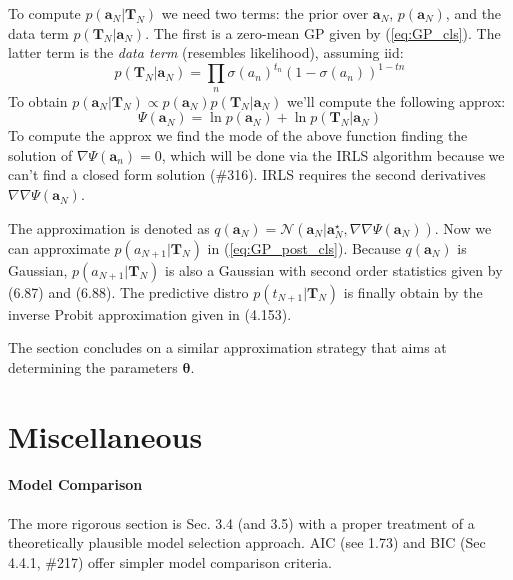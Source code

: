 \documentclass[a4paper]{article}
\newcommand{\mb}{\mathbf}
\newcommand{\bs}{\boldsymbol}
\begin{document}
To compute $p(\mb{a}_{N}|\mb{T}_{N})$ we need two terms: the prior over $\mb{a}_N$, $p(\mb{a}_{N})$, and the data term $p(\mb{T}_{N}|\mb{a}_{N})$. The first is a zero-mean GP given by (\ref{eq:GP_cls}). The latter term is the \textit{data term} (resembles likelihood), assuming iid:
%
\begin{equation}
p(\mb{T}_N|\mb{a}_N) = \prod\limits_n \sigma(a_n)^{t_n}(1-\sigma(a_n))^{1-tn}
\end{equation}
%
To obtain $p(\mb{a}_N|\mb{T}_N)\propto p(\mb{a}_N)p(\mb{T}_N|\mb{a}_N)$ we'll compute the following approx:
%
\begin{equation}
\Psi(\mb{a}_N) = \ln p(\mb{a}_N) + \ln p(\mb{T}_N|\mb{a}_N)
\end{equation}
%
To compute the approx we find the mode of the above function finding the solution of $\nabla \Psi(\mb{a}_n)=0$, which will be done via the IRLS algorithm because we can't find a closed form solution (\#316). IRLS requires the second derivatives $\nabla\nabla\Psi(\mb{a}_N)$.

The approximation is denoted as $q(\mb{a}_N) = \mathcal{N}(\mb{a}_N|\mb{a}_N^\star, \nabla\nabla\Psi(\mb{a}_N))$. Now we can approximate $p(a_{N+1}|\mb{T}_N)$ in (\ref{eq:GP_post_cls}). Because $q(\mb{a}_N)$ is Gaussian, $p(a_{N+1}|\mb{T}_N)$ is also a Gaussian with second order statistics given by (6.87) and (6.88). The predictive distro $p(t_{N+1}|\mb{T}_N)$ is finally obtain by the inverse Probit approximation given in (4.153).

The section concludes on a similar approximation strategy that aims at determining the parameters $\bs{\theta}$.









\clearpage
\newpage



\section*{Miscellaneous}
\paragraph*{Model Comparison} The more rigorous section is Sec. 3.4 (and 3.5) with a proper treatment of a theoretically plausible model selection approach. AIC (see 1.73) and BIC (Sec 4.4.1, \#217) offer simpler model comparison criteria.







\end{document}

